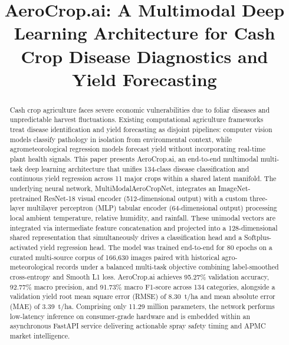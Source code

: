 \documentclass[conference]{IEEEtran}
\begin{document}
\title{AeroCrop.ai: A Multimodal Deep Learning Architecture for Cash Crop Disease Diagnostics and Yield Forecasting}

\author{
}

\maketitle

\begin{abstract}
Cash crop agriculture faces severe economic vulnerabilities due to foliar diseases and unpredictable harvest fluctuations. Existing computational agriculture frameworks treat disease identification and yield forecasting as disjoint pipelines: computer vision models classify pathology in isolation from environmental context, while agrometeorological regression models forecast yield without incorporating real-time plant health signals. This paper presents AeroCrop.ai, an end-to-end multimodal multi-task deep learning architecture that unifies 134-class disease classification and continuous yield regression across 11 major crops within a shared latent manifold. The underlying neural network, MultiModalAeroCropNet, integrates an ImageNet-pretrained ResNet-18 visual encoder (512-dimensional output) with a custom three-layer multilayer perceptron (MLP) tabular encoder (64-dimensional output) processing local ambient temperature, relative humidity, and rainfall. These unimodal vectors are integrated via intermediate feature concatenation and projected into a 128-dimensional shared representation that simultaneously drives a classification head and a Softplus-activated yield regression head. The model was trained end-to-end for 80 epochs on a curated multi-source corpus of 166,630 images paired with historical agro-meteorological records under a balanced multi-task objective combining label-smoothed cross-entropy and Smooth L1 loss. AeroCrop.ai achieves 95.27\% validation accuracy, 92.77\% macro precision, and 91.73\% macro F1-score across 134 categories, alongside a validation yield root mean square error (RMSE) of 8.30~t/ha and mean absolute error (MAE) of 3.39~t/ha. Comprising only 11.29 million parameters, the network performs low-latency inference on consumer-grade hardware and is embedded within an asynchronous FastAPI service delivering actionable spray safety timing and APMC market intelligence.
\end{abstract}
\end{document}
